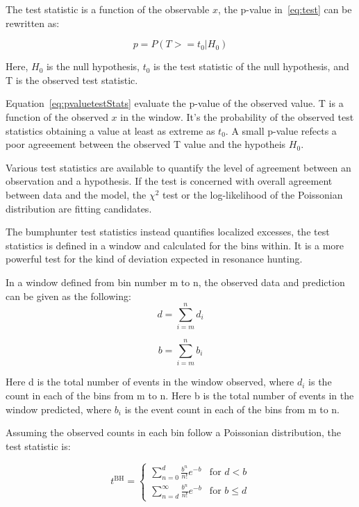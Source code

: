 The test statistic is a function of the observable $x$, the p-value in~\ref{eq:test} can be rewritten as:
    
\begin{equation}
    p = P(T>=t_{0}| H_{0})
\label{eq:pvaluetestStats}
\end{equation}

Here, $H_0$ is the null hypothesis, $t_0$ is the test statistic of the null hypothesis, and T is the observed test statistic.

Equation~\ref{eq:pvaluetestStats} evaluate the p-value of the observed value. T is a function of the observed $x$ in the window. It's the probability of the observed test statistics obtaining a value at least as extreme as $t_{0}$. A small p-value refects a poor agreeement between the observed T value and the hypotheis $H_{0}$.

Various test statistics are available to quantify the level of agreement between an observation and a hypothesis. If the test is concerned with overall agreement between data and the model, the $\chi^{2}$ test or the log-likelihood of the Poissonian distribution are fitting candidates.

The bumphunter test statistics instead quantifies localized excesses, the test statistics is defined in a window and calculated for the bins within. It is a more powerful test for the kind of deviation expected in resonance hunting.

In a window defined from bin number m to n, the observed data and prediction can be given as the following: 
    \begin{equation}
         d= \sum_{i=m}^{n} d_i 
    \end{equation}

    
    \begin{equation}
         b= \sum_{i=m}^{n} b_i
    \end{equation}

    Here d is the total number of events in the window observed, where $d_i$ is the count in each of the bins from m to n. 
    Here b is the total number of events in the window predicted, where $b_i$ is the event count in each of the bins from m to n.
    
    Assuming the observed counts in each bin follow a Poissonian distribution, the test statistic is:

\begin{equation}
    t^{\textrm{BH}}=
    \begin{cases} \sum_{n=0}^{d} \frac{b^{n}}{n!} e^{-b} &  \textrm{for $d < b$}
    \\
    \sum_{n=d}^{\infty} \frac{b^n}{n!} e^{-b} &  \textrm{for $b \leq d$}
    \end{cases}
\end{equation}

